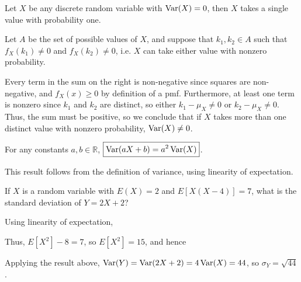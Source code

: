 \begin{prop}Let $X$ be any discrete random variable with $\operatorname{Var}(X) = 0$, then $X$ takes a single value with probability one.
\end{prop}

\begin{pf} Let $A$ be the set of possible values of $X$, and suppose that $k_1, k_2 \in A$ such that $f_X(k_1) \neq 0$ and $f_X (k_2) \neq 0$, i.e. $X$ can take either value with nonzero probability.
\par
\noindent Every term in the sum on the right is non-negative since squares are non-negative, and $f_X(x) \geq 0$ by definition of a pmf. Furthermore, at least one term is nonzero since $k_1$ and $k_2$ are distinct, so either $k_1  - \mu_X \neq 0$ or $k_2 - \mu_X \neq 0$. Thus, the sum must be positive, so we conclude that if $X$ takes more than one distinct value with nonzero probability, $\operatorname{Var}(X) \neq 0$.
\end{pf}

\begin{thm}\label{VarianceLinearity} For any constants $a, b \in \mathbb{R}$, $\boxed{\operatorname{Var}(aX+b) = a^2\operatorname{Var}(X)}$.
\end{thm}
\begin{pf} This result follows from the definition of variance, using linearity of expectation.
\end{pf}

\begin{examp} If $X$ is a random variable with $E(X) = 2$ and $E[X(X-4)]=7$, what is the standard deviation of $Y = 2X+2$?
\par
\noindent Using linearity of expectation,
\par
\noindent Thus, $E[X^2] - 8 = 7$, so $E[X^2] = 15$, and hence 
\par
\noindent Applying the result above, $\operatorname{Var}(Y) = \operatorname{Var}(2X+2) = 4\operatorname{Var}(X) = 44$, so $\sigma_Y = \sqrt{44}$.
\end{examp}

